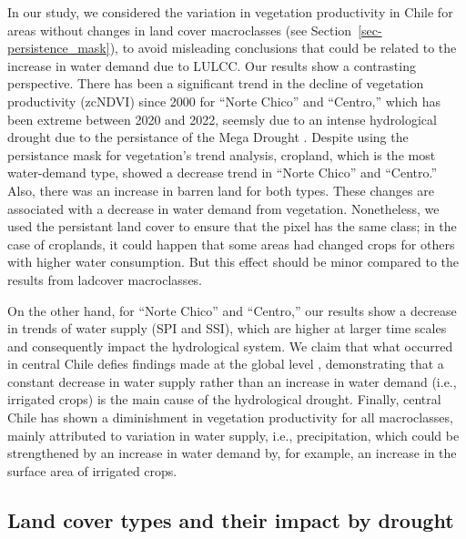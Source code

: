 \documentclass[
  authoryear,
  preprint,
  3p,
  onecolumn]{elsarticle}
\begin{document}
In our study, we considered the variation in vegetation productivity in
Chile for areas without changes in land cover macroclasses (see
Section~\ref{sec-persistence_mask}), to avoid misleading conclusions
that could be related to the increase in water demand due to LULCC. Our
results show a contrasting perspective. There has been a significant
trend in the decline of vegetation productivity (zcNDVI) since 2000 for
``Norte Chico'' and ``Centro,'' which has been extreme between 2020 and
2022, seemsly due to an intense hydrological drought due to the
persistance of the Mega Drought \citep{Garreaud2017}. Despite using the
persistance mask for vegetation's trend analysis, cropland, which is the
most water-demand type, showed a decrease trend in ``Norte Chico'' and
``Centro.'' Also, there was an increase in barren land for both types.
These changes are associated with a decrease in water demand from
vegetation. Nonetheless, we used the persistant land cover to ensure
that the pixel has the same class; in the case of croplands, it could
happen that some areas had changed crops for others with higher water
consumption. But this effect should be minor compared to the results
from ladcover macroclasses.

On the other hand, for ``Norte Chico'' and ``Centro,'' our results show
a decrease in trends of water supply (SPI and SSI), which are higher at
larger time scales and consequently impact the hydrological system. We
claim that what occurred in central Chile defies findings made at the
global level \citep{Vicente-Serrano2021, Kogan2020}, demonstrating that
a constant decrease in water supply rather than an increase in water
demand (i.e., irrigated crops) is the main cause of the hydrological
drought. Finally, central Chile has shown a diminishment in vegetation
productivity for all macroclasses, mainly attributed to variation in
water supply, i.e., precipitation, which could be strengthened by an
increase in water demand by, for example, an increase in the surface
area of irrigated crops.

\hypertarget{land-cover-types-and-their-impact-by-drought}{%
\subsection{Land cover types and their impact by
drought}\label{land-cover-types-and-their-impact-by-drought}}
\end{document}
